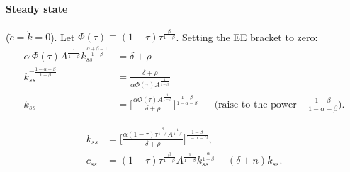 \paragraph{Steady state} ($\dot c=\dot k=0$). Let $\Phi(\tau)\equiv(1-\tau)\tau^{\frac{\beta}{1-\beta}}$. Setting the EE bracket to zero:
\begin{align*}
\alpha\,\Phi(\tau)A^{\frac1{1-\beta}}k_{ss}^{\frac{\alpha+\beta-1}{1-\beta}}&=\delta+\rho\\
k_{ss}^{-\frac{1-\alpha-\beta}{1-\beta}}&=\frac{\delta+\rho}{\alpha\Phi(\tau)A^{\frac1{1-\beta}}}\\
k_{ss}&=\Big[\frac{\alpha\Phi(\tau)A^{\frac1{1-\beta}}}{\delta+\rho}\Big]^{\frac{1-\beta}{1-\alpha-\beta}}
&&\text{(raise to the power $-\tfrac{1-\beta}{1-\alpha-\beta}$).}
\end{align*}
\begin{keybox}[title={Steady state with infrastructure (requires $\alpha+\beta<1$)}]
\begin{align}
k_{ss}&=\Big[\frac{\alpha(1-\tau)\tau^{\frac{\beta}{1-\beta}}A^{\frac1{1-\beta}}}{\delta+\rho}\Big]^{\frac{1-\beta}{1-\alpha-\beta}}, \label{rm:in11}\\
c_{ss}&=(1-\tau)\tau^{\frac{\beta}{1-\beta}}A^{\frac1{1-\beta}}k_{ss}^{\frac{\alpha}{1-\beta}}-(\delta+n)k_{ss}. \label{rm:in12}
\end{align}
\end{keybox}

